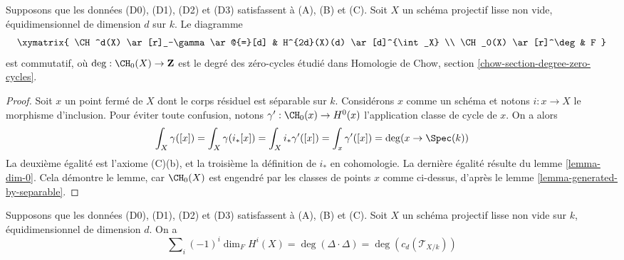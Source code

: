 \begin{lemma}
\label{lemma-degrees-cycles}
Supposons que les données (D0), (D1), (D2) et (D3) satisfassent à (A), (B) et (C).
Soit $X$ un schéma projectif lisse non vide,
équidimensionnel de dimension $d$ sur $k$. Le diagramme
$$
\xymatrix{
\CH^d(X) \ar[r]_-\gamma \ar@{=}[d] &
H^{2d}(X)(d) \ar[d]^{\int_X} \\
\CH_0(X) \ar[r]^\deg & F
}
$$
est commutatif, où $\deg : \CH_0(X) \to \mathbf{Z}$ est le degré des
zéro-cycles étudié dans Homologie de Chow, section
\ref{chow-section-degree-zero-cycles}.
\end{lemma}

\begin{proof}
Soit $x$ un point fermé de $X$ dont le corps résiduel est séparable
sur $k$. Considérons $x$ comme un schéma et notons $i : x \to X$ le morphisme d'inclusion.
Pour éviter toute confusion, notons $\gamma' : \CH_0(x) \to H^0(x)$ l'application classe de cycle
de $x$. On a alors
$$
\int_X \gamma([x]) = \int_X \gamma(i_*[x]) =
\int_X i_*\gamma'([x]) = \int_x \gamma'([x]) = \deg(x \to \Spec(k))
$$
La deuxième égalité est l'axiome (C)(b), et la troisième
la définition de $i_*$ en cohomologie. La dernière égalité résulte du
lemme \ref{lemma-dim-0}. Cela démontre le lemme,
car $\CH_0(X)$ est engendré par les classes de points $x$ comme ci-dessus,
d'après le lemme \ref{lemma-generated-by-separable}.
\end{proof}

\begin{lemma}
\label{lemma-square-diagonal}
Supposons que les données (D0), (D1), (D2) et (D3) satisfassent à (A), (B) et (C).
Soit $X$ un schéma projectif lisse non vide sur $k$,
équidimensionnel de dimension $d$. On a
$$
\sum\nolimits_i (-1)^i\dim_F H^i(X) =
\deg(\Delta \cdot \Delta) = \deg(c_d(\mathcal{T}_{X/k}))
$$
\end{lemma}

